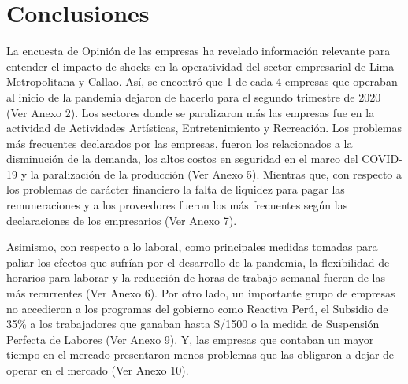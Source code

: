 \documentclass[12pt]{article}
\begin{document}
        \section{Conclusiones}
        La encuesta de Opinión de las empresas ha revelado información relevante para entender el impacto de shocks
        en la operatividad del sector empresarial de Lima Metropolitana y Callao. Así, se encontró que 1 de cada 4
        empresas que operaban al inicio de la pandemia dejaron de hacerlo para el segundo trimestre de 2020 (Ver Anexo 2).
        Los sectores donde se paralizaron más las empresas fue en la actividad de Actividades Artísticas, Entretenimiento y Recreación.
        Los problemas más frecuentes declarados por las empresas, fueron los relacionados a la disminución de la demanda,
        los altos costos en seguridad en el marco del COVID-19 y la paralización de la producción (Ver Anexo 5).
        Mientras que, con respecto a los problemas de carácter financiero la falta de liquidez para pagar las remuneraciones
        y a los proveedores fueron los más frecuentes según las declaraciones de los empresarios (Ver Anexo 7).

        Asimismo, con respecto a lo laboral, como principales medidas tomadas para paliar los efectos que sufrían por
        el desarrollo de la pandemia, la flexibilidad de horarios para laborar y la reducción de horas de trabajo
        semanal fueron de las más recurrentes (Ver Anexo 6). Por otro lado, un importante grupo de empresas no accedieron
        a los programas del gobierno como Reactiva Perú, el Subsidio de 35\% a los trabajadores que ganaban hasta S/1500
        o la medida de Suspensión Perfecta de Labores (Ver Anexo 9). Y, las empresas que contaban un mayor tiempo en el
        mercado presentaron menos problemas que las obligaron a dejar de operar en el mercado (Ver Anexo 10).
\end{document}
